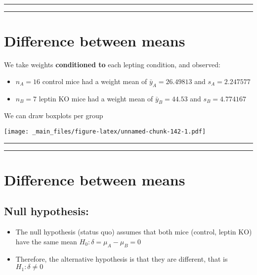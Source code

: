 \documentclass[
]{book}
\begin{document}
\begin{center}\rule{0.5\linewidth}{0.5pt}\end{center}

\begin{center}\rule{0.5\linewidth}{0.5pt}\end{center}

\hypertarget{difference-between-means-6}{%
\section{Difference between means}\label{difference-between-means-6}}

We take weights \textbf{conditioned to} each lepting condition, and observed:

\begin{itemize}
\item
  \(n_A=16\) control mice had a weight mean of \(\bar{y}_A=26.49813\) and \(s_A=2.247577\)
\item
  \(n_B=7\) leptin KO mice had a weight mean of \(\bar{y}_B=44.53\) and \(s_B=4.774167\)
\end{itemize}

We can draw boxplots per group

\texttt{[image: \_main\_files/figure-latex/unnamed-chunk-142-1.pdf]}

\begin{center}\rule{0.5\linewidth}{0.5pt}\end{center}

\begin{center}\rule{0.5\linewidth}{0.5pt}\end{center}

\hypertarget{difference-between-means-7}{%
\section{Difference between means}\label{difference-between-means-7}}

\hypertarget{null-hypothesis-5}{%
\subsection{Null hypothesis:}\label{null-hypothesis-5}}

\begin{itemize}
\item
  The null hypothesis (status quo) assumes that both mice (control, leptin KO) have the same mean \(H_0: \delta=\mu_A-\mu_B=0\)
\item
  Therefore, the alternative hypothesis is that they are different, that is \(H_1: \delta \neq 0\)
\end{itemize}
\end{document}
